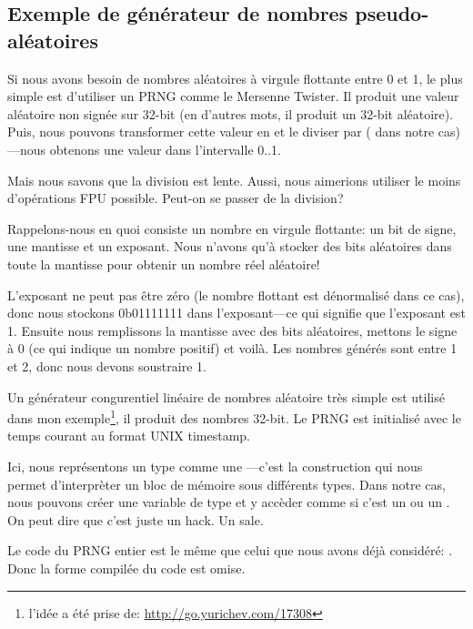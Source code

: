 \subsection{Exemple de générateur de nombres pseudo-aléatoires}
\label{FPU_PRNG}

Si nous avons besoin de nombres aléatoires à virgule flottante entre 0 et 1, le plus
simple est d'utiliser un \ac{PRNG} comme le Mersenne Twister.
Il produit une valeur aléatoire non signée sur 32-bit (en d'autres mots, il produit
un 32-bit aléatoire).
Puis, nous pouvons transformer cette valeur en \Tfloat et le diviser par 
( dans notre cas)---nous obtenons une valeur dans l'intervalle 0..1.

Mais nous savons que la division est lente.
Aussi, nous aimerions utiliser le moins d'opérations FPU possible.
Peut-on se passer de la division?


Rappelons-nous en quoi consiste un nombre en virgule flottante: un bit de signe,
une mantisse et un exposant.
Nous n'avons qu'à stocker des bits aléatoires dans toute la mantisse pour obtenir
un nombre réel aléatoire!

L'exposant ne peut pas être zéro (le nombre flottant est dénormalisé dans ce cas),
donc nous stockons 0b01111111 dans l'exposant---ce qui signifie que l'exposant est
1.
Ensuite nous remplissons la mantisse avec des bits aléatoires, mettons le signe à
0 (ce qui indique un nombre positif) et voilà.
Les nombres générés sont entre 1 et 2, donc nous devons soustraire 1.

\newcommand{\URLXOR}{\url{http://go.yurichev.com/17308}}

Un générateur congurentiel linéaire de nombres aléatoire très simple est utilisé dans
mon exemple\footnote{l'idée a été prise de: \URLXOR}, il produit des nombres 32-bit.
Le \ac{PRNG} est initialisé avec le temps courant au format UNIX timestamp.

Ici, nous représentons un type \Tfloat comme une ---c'est la construction \CCpp qui nous
permet d'interprèter un bloc de mémoire sous différents types.
Dans notre cas, nous pouvons créer une variable de type  et y accèder comme
si c'est un \Tfloat ou un .
On peut dire que c'est juste un hack. Un sale.


Le code du \ac{PRNG} entier est le même que celui que nous avons déjà considéré: .
Donc la forme compilée du code est omise.

